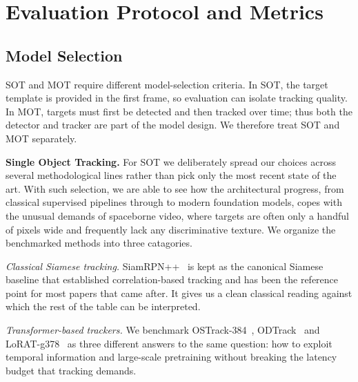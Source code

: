 \documentclass{article}
\begin{document}
\section{Evaluation Protocol and Metrics}
\subsection{Model Selection}
\label{sec:model_selection}

SOT and MOT require different model-selection criteria. In SOT, the target template is provided in the first frame, so evaluation can isolate tracking quality. In MOT, targets must first be detected and then tracked over time; thus both the detector and tracker are part of the model design. We therefore treat SOT and MOT separately.

\noindent\textbf{Single Object Tracking.}
For SOT we deliberately spread our choices across several methodological
lines rather than pick only the most recent state of the art. With such selection, we are able to see how the architectural progress, from classical supervised pipelines
through to modern foundation models, copes with the unusual demands of
spaceborne video, where targets are often only a handful of pixels wide
and frequently lack any discriminative texture. We organize the
benchmarked methods into three catagories.

\textit{Classical Siamese tracking.} SiamRPN++~\citep{li2019siamrpn++} is
kept as the canonical Siamese baseline that established correlation-based
tracking and has been the reference point for most papers that came
after. It gives us a clean classical reading against which the rest of
the table can be interpreted.

\textit{Transformer-based trackers.} We benchmark
OSTrack-384~\citep{ye2022joint}, ODTrack~\citep{zheng2024odtrack} and
LoRAT-g378~\citep{lin2024tracking} as three different answers to the same
question: how to exploit temporal information and large-scale pretraining
without breaking the latency budget that tracking demands.
\end{document}
